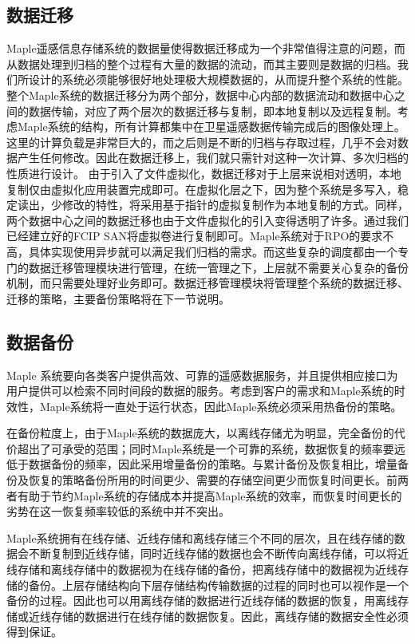 \documentclass{article}
\begin{document}
\subsection{数据迁移}
Maple遥感信息存储系统的数据量使得数据迁移成为一个非常值得注意的问题，而从数据处理到归档的整个过程有大量的数据的流动，而其主要则是数据的归档。我们所设计的系统必须能够很好地处理极大规模数据的，从而提升整个系统的性能。整个Maple系统的数据迁移分为两个部分，数据中心内部的数据流动和数据中心之间的数据传输，对应了两个层次的数据迁移与复制，即本地复制以及远程复制。考虑Maple系统的结构，所有计算都集中在卫星遥感数据传输完成后的图像处理上。这里的计算负载是非常巨大的，而之后则是不断的归档与存取过程，几乎不会对数据产生任何修改。因此在数据迁移上，我们就只需针对这种一次计算、多次归档的性质进行设计。
由于引入了文件虚拟化，数据迁移对于上层来说相对透明，本地复制仅由虚拟化应用装置完成即可。在虚拟化层之下，因为整个系统是多写入，稳定读出，少修改的特性，将采用基于指针的虚拟复制作为本地复制的方式。同样，两个数据中心之间的数据迁移也由于文件虚拟化的引入变得透明了许多。通过我们已经建立好的FCIP SAN将虚拟卷进行复制即可。Maple系统对于RPO的要求不高，具体实现使用异步就可以满足我们归档的需求。而这些复杂的调度都由一个专门的数据迁移管理模块进行管理，在统一管理之下，上层就不需要关心复杂的备份机制，而只需要处理好业务即可。数据迁移管理模块将管理整个系统的数据迁移、迁移的策略，主要备份策略将在下一节说明。



\subsection{数据备份}
Maple 系统要向各类客户提供高效、可靠的遥感数据服务，并且提供相应接口为用户提供可以检索不同时间段的数据的服务。考虑到客户的需求和Maple系统的时效性，Maple系统将一直处于运行状态，因此Maple系统必须采用热备份的策略。

在备份粒度上，由于Maple系统的数据庞大，以离线存储尤为明显，完全备份的代价超出了可承受的范围；同时Maple系统是一个可靠的系统，数据恢复的频率要远低于数据备份的频率，因此采用增量备份的策略。与累计备份及恢复相比，增量备份及恢复的策略备份所用的时间更少、需要的存储空间更少而恢复时间更长。前两者有助于节约Maple系统的存储成本并提高Maple系统的效率，而恢复时间更长的劣势在这一恢复频率较低的系统中并不突出。

Maple系统拥有在线存储、近线存储和离线存储三个不同的层次，且在线存储的数据会不断复制到近线存储，同时近线存储的数据也会不断传向离线存储，可以将近线存储和离线存储中的数据视为在线存储的备份，把离线存储中的数据视为近线存储的备份。上层存储结构向下层存储结构传输数据的过程的同时也可以视作是一个备份的过程。因此也可以用离线存储的数据进行近线存储的数据的恢复，用离线存储或近线存储的数据进行在线存储的数据恢复。因此，离线存储的数据安全性必须得到保证。
\end{document}
